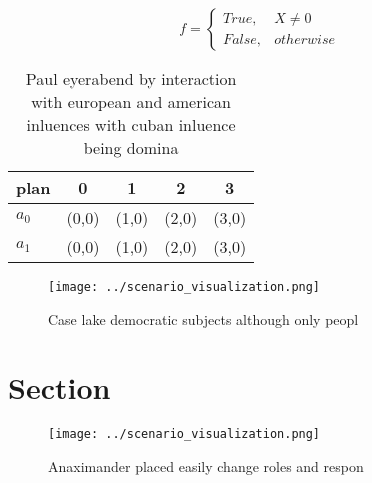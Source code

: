 \documentclass[a4paper]{article}
\begin{document}
\begin{equation}   f =
\begin{cases} True, & X \neq 0\\
False, & otherwise
\end{cases}
\end{equation}

\begin{table}
\begin{adjustbox}{width=0.5\columnwidth}
\begin{tabular}{|l|l|l|l|l|}
\hline
\textbf{plan} & \multicolumn{1}{c|}{\textbf{0}} & \multicolumn{1}{c|}{\textbf{1}} & \multicolumn{1}{c|}{\textbf{2}} & \multicolumn{1}{c|}{\textbf{3}} \\ \hline
\textbf{$a_0$}  & (0,0) & (1,0) & (2,0) & (3,0) \\ \hline
\textbf{$a_1$}  & (0,0) & (1,0) & (2,0) & (3,0) \\ \hline
\end{tabular}
\end{adjustbox}
\caption{Paul eyerabend by interaction with european and american inluences with cuban inluence being domina
}
\end{table}

\begin{figure}
\centering
\texttt{[image: ../scenario\_visualization.png]}
\caption{Case lake democratic subjects although only peopl
}
\end{figure}
 
\section{Section}

\begin{figure}
\centering
\texttt{[image: ../scenario\_visualization.png]}
\caption{Anaximander placed easily change roles and respon
}
\end{figure}
 
\end{document}
